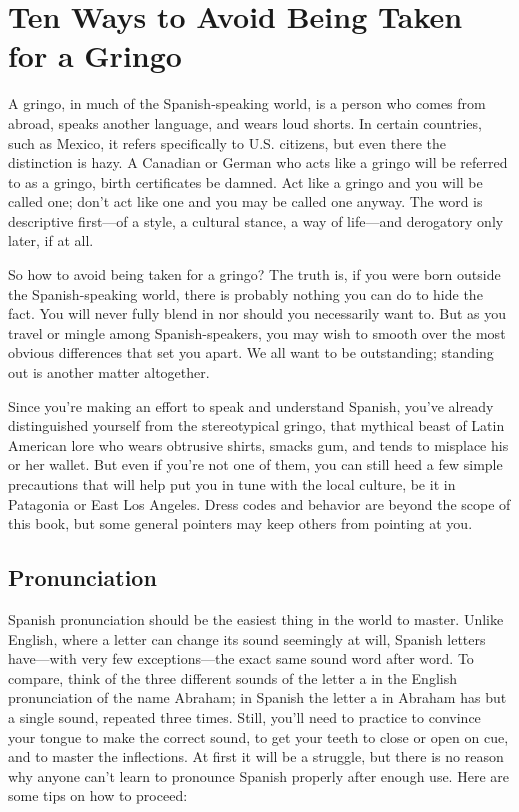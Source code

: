 \chapter{Ten Ways to Avoid Being Taken for a Gringo}

A gringo, in much of the Spanish-speaking world, is a person
who comes from abroad, speaks another language, and wears loud
shorts. In certain countries, such as Mexico, it refers specifically to
U.S. citizens, but even there the distinction is hazy. A Canadian or
German who acts like a gringo will be referred to as a gringo, birth certificates be damned. Act like a gringo and you will be called one; don't
act like one and you may be called one anyway. The word is descriptive
first---of a style, a cultural stance, a way of life---and derogatory only
later, if at all.

So how to avoid being taken for a gringo? The truth is, if you
were born outside the Spanish-speaking world, there is probably nothing you can do to hide the fact. You will never fully blend in nor
should you necessarily want to. But as you travel or mingle among
Spanish-speakers, you may wish to smooth over the most obvious differences that set you apart. We all want to be outstanding; standing out
is another matter altogether.

Since you're making an effort to speak and understand Spanish, you've already distinguished yourself from the stereotypical
gringo, that mythical beast of Latin American lore who wears obtrusive shirts, smacks gum, and tends to misplace his or her wallet. But
even if you're not one of them, you can still heed a few simple precautions that will help put you in tune with the local culture, be it in Patagonia or East Los Angeles. Dress codes and behavior are beyond the
scope of this book, but some general pointers may keep others from
pointing at you.

\section{Pronunciation}

Spanish pronunciation should be the easiest thing in the world
to master. Unlike English, where a letter can change its sound seemingly at will, Spanish letters have---with very few exceptions---the exact same sound word after word. To compare, think of the three different sounds of the letter a in the English pronunciation of the name
Abraham; in Spanish the letter a in Abraham has but a single sound,
repeated three times. Still, you'll need to practice to convince your
tongue to make the correct sound, to get your teeth to close or open on
cue, and to master the inflections. At first it will be a struggle, but
there is no reason why anyone can't learn to pronounce Spanish properly after enough use. Here are some tips on how to proceed:

